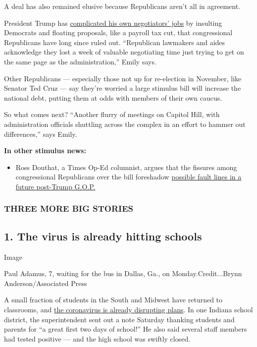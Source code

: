 A deal has also remained elusive because Republicans aren't all in
agreement.

President Trump has
\href{https://www.nytimes3xbfgragh.onion/2020/08/03/us/politics/congress-jobless-aid-talks-trump.html}{complicated
his own negotiators' jobs} by insulting Democrats and floating
proposals, like a payroll tax cut, that congressional Republicans have
long since ruled out. ``Republican lawmakers and aides acknowledge they
lost a week of valuable negotiating time just trying to get on the same
page as the administration,'' Emily says.

Other Republicans --- especially those not up for re-election in
November, like Senator Ted Cruz --- say they're worried a large stimulus
bill will increase the national debt, putting them at odds with members
of their own caucus.

So what comes next? ``Another flurry of meetings on Capitol Hill, with
administration officials shuttling across the complex in an effort to
hammer out differences,'' says Emily.

\textbf{In other stimulus news:}

\begin{itemize}
\tightlist
\item
  Ross Douthat, a Times Op-Ed columnist, argues that the fissures among
  congressional Republicans over the bill foreshadow
  \href{https://www.nytimes3xbfgragh.onion/2020/08/04/opinion/trump-republicans-tea-party.html}{possible
  fault lines in a future post-Trump G.O.P.}
\end{itemize}

\hypertarget{three-more-big-stories}{%
\subsubsection{\texorpdfstring{\textbf{THREE MORE BIG
STORIES}}{THREE MORE BIG STORIES}}\label{three-more-big-stories}}

\hypertarget{1-the-virus-is-already-hitting-schools}{%
\subsection{1. The virus is already hitting
schools}\label{1-the-virus-is-already-hitting-schools}}

Image

Paul Adamus, 7, waiting for the bus in Dallas, Ga., on
Monday.Credit...Brynn Anderson/Associated Press

A small fraction of students in the South and Midwest have returned to
classrooms, and
\href{https://www.nytimes3xbfgragh.onion/2020/08/03/us/school-closing-coronavirus.html}{the
coronavirus is already disrupting plans}. In one Indiana school
district, the superintendent sent out a note Saturday thanking students
and parents for ``a great first two days of school!'' He also said
several staff members had tested positive --- and the high school was
swiftly closed.

